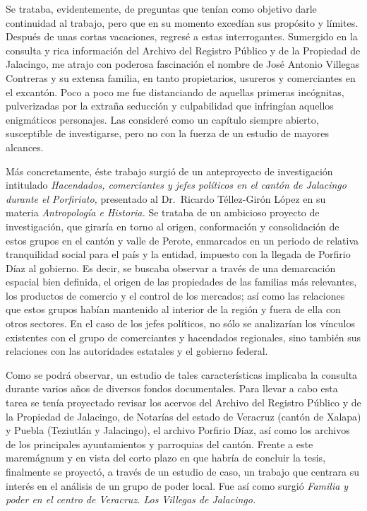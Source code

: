 \documentclass[14pt,twoside,final]{extbook} %
\begin{document}
Se trataba, evidentemente, de preguntas que tenían como objetivo darle continuidad al trabajo, pero que en su momento excedían sus propósito y límites. Después de unas cortas vacaciones, regresé a estas interrogantes. Sumergido en la consulta y rica información del Archivo del Registro Público y de la Propiedad de Jalacingo, me atrajo con poderosa fascinación el nombre de José Antonio Villegas Contreras y su extensa familia, en tanto propietarios, usureros y comerciantes en el excantón. Poco a poco me fue distanciando de aquellas primeras incógnitas, pulverizadas por la extraña seducción y culpabilidad que infringían aquellos enigmáticos personajes. Las consideré como un capítulo siempre abierto, susceptible de investigarse, pero no con la fuerza de un estudio de mayores alcances.

Más concretamente, éste trabajo surgió de un anteproyecto de investigación intitulado \emph{Hacendados, comerciantes y jefes políticos en el cantón de Jalacingo durante el Porfiriato,} presentado al Dr.~Ricardo Téllez-Girón López en su materia \emph{Antropología e Historia.} Se trataba de un ambicioso proyecto de investigación, que giraría en torno al origen, conformación y consolidación de estos grupos en el cantón y valle de Perote, enmarcados en un periodo de relativa tranquilidad social para el país y la entidad, impuesto con la llegada de Porfirio Díaz al gobierno. Es decir, se buscaba observar a través de una demarcación espacial bien definida, el origen de las propiedades de las familias más relevantes, los productos de comercio y el control de los mercados; así como las relaciones que estos grupos habían mantenido al interior de la región y fuera de ella con otros sectores. En el caso de los jefes políticos, no sólo se analizarían los vínculos existentes con el grupo de comerciantes y hacendados regionales, sino también sus relaciones con las autoridades estatales y el gobierno federal.

Como se podrá observar, un estudio de tales características implicaba la consulta durante varios años de diversos fondos documentales. Para llevar a cabo esta tarea se tenía proyectado revisar los acervos del Archivo del Registro Público y de la Propiedad de Jalacingo, de Notarías del estado de Veracruz (cantón de Xalapa) y Puebla (Teziutlán y Jalacingo), el archivo Porfirio Díaz, así como los archivos de los principales ayuntamientos y parroquias del cantón. Frente a este maremágnum y en vista del corto plazo en que habría de concluir la tesis, finalmente se proyectó, a través de un estudio de caso, un trabajo que centrara su interés en el análisis de un grupo de poder local. Fue así como surgió \emph{Familia y poder en el centro de Veracruz. Los Villegas de Jalacingo.}
\end{document}
